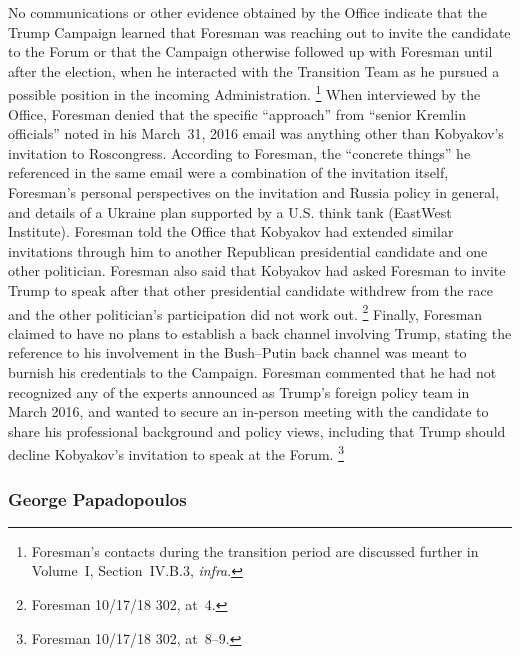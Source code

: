 No communications or other evidence obtained by the Office indicate that the Trump Campaign learned that Foresman was reaching out to invite the candidate to the Forum or that the Campaign otherwise followed up with Foresman until after the election, when he interacted with the Transition Team as he pursued a possible position in the incoming Administration.%
\footnote{Foresman's contacts during the transition period are discussed further in Volume~I, Section~IV.B.3, \textit{infra}.}
When interviewed by the Office, Foresman denied that the specific ``approach'' from ``senior Kremlin officials'' noted in his March~31, 2016 email was anything other than Kobyakov's invitation to Roscongress.
According to Foresman, the ``concrete things'' he referenced in the same email were a combination of the invitation itself, Foresman's personal perspectives on the invitation and Russia policy in general, and details of a Ukraine plan supported by a U.S. think tank (EastWest Institute).
Foresman told the Office that Kobyakov had extended similar invitations through him to another Republican presidential candidate and one other politician.
Foresman also said that Kobyakov had asked Foresman to invite Trump to speak after that other presidential candidate withdrew from the race and the other politician's participation did not work out.%
\footnote{Foresman 10/17/18 302, at~4.}
Finally, Foresman claimed to have no plans to establish a back channel involving Trump, stating the reference to his involvement in the Bush--Putin back channel was meant to burnish his credentials to the Campaign.
Foresman commented that he had not recognized any of the experts announced as Trump's foreign policy team in March 2016, and wanted to secure an in-person meeting with the candidate to share his professional background and policy views, including that Trump should decline Kobyakov's invitation to speak at the Forum.%
\footnote{Foresman 10/17/18 302, at~8--9.}

\subsubsection{George Papadopoulos}

